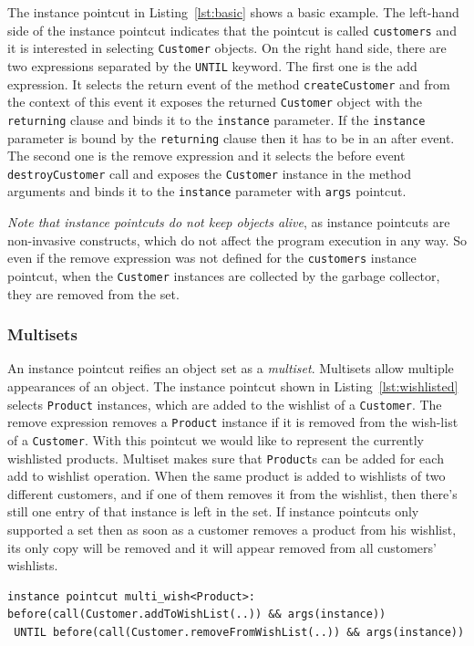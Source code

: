 \documentclass{acm_proc_article-sp}
\begin{document}
The instance pointcut in Listing~\ref{lst:basic} shows a basic example. The left-hand side of the instance pointcut indicates that the pointcut is called \texttt{customers} and it is interested in selecting \texttt{Customer} objects. 
On the right hand side, there are two expressions separated by the \texttt{UNTIL} keyword. The first one is the add expression. It selects the return event of the method \texttt{createCustomer} and from the context of this event it exposes the returned \texttt{Customer} object with the \texttt{returning} clause and binds it to the \texttt{instance} parameter. If the \texttt{instance} parameter is bound by the \texttt{returning} clause then it has to be in an after event. The second one is the remove expression and it selects the before event \texttt{destroyCustomer} call and exposes the \texttt{Customer} instance in the method arguments and binds it to the \texttt{instance} parameter with \texttt{args} pointcut.


\emph{Note that instance pointcuts do not keep objects alive}, as instance pointcuts are non-invasive constructs, which do not affect the program execution in any way. So even if the remove expression was not defined for the \texttt{customers} instance pointcut, when the \texttt{Customer} instances are collected by the garbage collector, they are removed from the set. 


\subsubsection{Multisets}
An instance pointcut reifies an object set as a \emph{multiset}. Multisets allow multiple appearances of an object. The instance pointcut shown in Listing~\ref{lst:wishlisted} selects \texttt{Product} instances, which are added to the wishlist of a \texttt{Customer}. The remove expression removes a \texttt{Product} instance if it is removed from the wish-list of a \texttt{Customer}. With this pointcut we would like to represent the currently wishlisted products. Multiset makes sure that \texttt{Product}s can be added for each add to wishlist operation. When the same product is added to wishlists of two different customers, and if one of them removes it from the wishlist, then there's still one entry of that instance is left in the set.  If instance pointcuts only supported a set then as soon as a customer removes a product from his wishlist, its only copy will be removed and it will appear removed from all customers' wishlists.

\begin{lstlisting}[float=h!, caption={An instance pointcut utilizing multiset property}, label={lst:wishlisted}]
instance pointcut multi_wish<Product>: 
before(call(Customer.addToWishList(..)) && args(instance))
 UNTIL before(call(Customer.removeFromWishList(..)) && args(instance))
\end{lstlisting}
\end{document}
